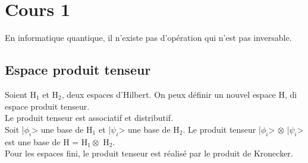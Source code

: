 \section{Cours 1}
En informatique quantique, il n'existe pas d'opération qui n'est pas inversable.

\subsection{Espace produit tenseur}
Soient H$_1$ et H$_2$, deux espaces d'Hilbert. On peux définir un nouvel espace H, di espace produit tenseur.\\
Le produit tenseur est associatif et distributif.\\
Soit |$\phi_i$> une base de H$_1$ et |$\psi_i$> une base de H$_2$. Le produit tenseur |$\phi_i$> $\otimes$ |$\psi_i$> 
est une base de H = H$_1\otimes$ H$_2$.\\
Pour les espaces fini, le produit tenseur est réalisé par le produit de Kronecker.
